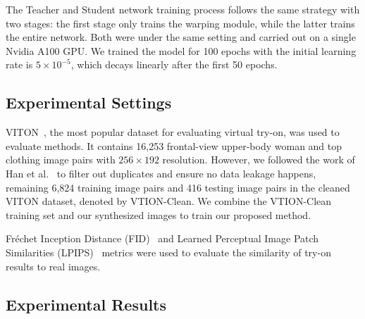 
The Teacher and Student network training process follows the same strategy with two stages: the first stage only trains the warping module, while the latter trains the entire network. Both were under the same setting and carried out on a single Nvidia A100 GPU. We trained the model for 100 epochs with the initial learning rate is $5 \times 10^{-5}$, which decays linearly after the first 50 epochs.


\subsection{Experimental Settings}

VITON~\cite{Han-CVPR2018-Viton}, the most popular dataset for evaluating virtual try-on, was used to evaluate methods. It contains 16,253 frontal-view upper-body woman and top clothing image pairs with $256 \times 192$ resolution. However, we followed the work of Han et al.~\cite{Han-ICCV2019-Clothflow} to filter out duplicates and ensure no data leakage happens, remaining 6,824 training image pairs and 416 testing image pairs in the cleaned VITON dataset, denoted by VTION-Clean. We combine the VTION-Clean training set and our synthesized images to train our proposed method.


Fréchet Inception Distance (FID)~\cite{Heusel-NeurIPS2017-FID} and Learned Perceptual Image Patch Similarities (LPIPS)~\cite{Zhang-CVPR2018-LPIPS} metrics were used to evaluate the similarity of try-on results to real images. 


\subsection{Experimental Results}


